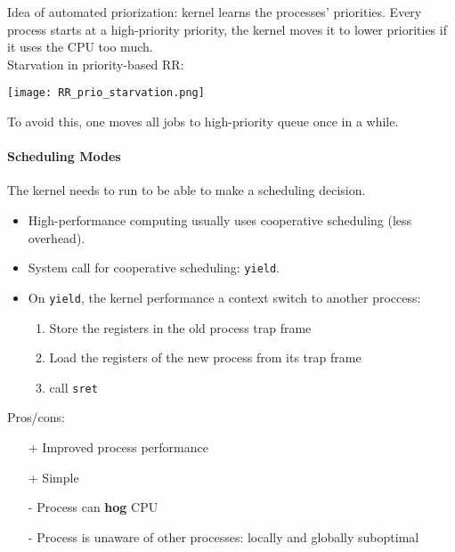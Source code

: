 Idea of automated priorization: kernel learns the processes' priorities. Every process starts at a high-priority priority, the kernel moves it to lower priorities if it uses the CPU too much.\\
Starvation in priority-based RR:
\begin{center}
    \texttt{[image: RR\_prio\_starvation.png]}
\end{center}
To avoid this, one moves all jobs to high-priority queue once in a while.

\paragraph{Scheduling Modes}
The kernel needs to run to be able to make a scheduling decision. 


\begin{itemize}
    \item High-performance computing usually uses cooperative scheduling (less overhead).
    \item System call for cooperative scheduling: \texttt{yield}.
    \item On \texttt{yield}, the kernel performance a context switch to another proccess:
    \begin{enumerate}
        \item Store the registers in the old process trap frame
        \item Load the registers of the new process from its trap frame
        \item call \texttt{sret}
    \end{enumerate}
\end{itemize}
Pros/cons:
\begin{itemize}
    \item[+] Improved process performance
    \item[+] Simple
    \item[-] Process can \textbf{hog} CPU
    \item[-] Process is unaware of other processes: locally and globally suboptimal
\end{itemize}

